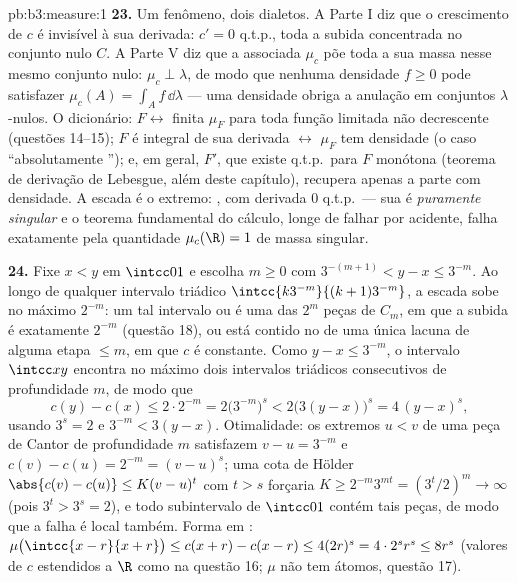 \begin{solution}{pb:b3:measure:1}
\textbf{23.} Um fenômeno, dois dialetos. A Parte I diz que o
crescimento de $c$ é invisível à sua derivada: $c' = 0$ q.t.p.,
toda a subida concentrada no conjunto nulo $C$. A Parte V
diz que a  associada $\mu_c$ põe toda a sua massa nesse
mesmo conjunto nulo: $\mu_c \perp \lambda$, de modo que nenhuma densidade $f \geq
0$ pode satisfazer $\mu_c(A) = \int_Af\,\dd\lambda$ --- uma densidade
obriga a anulação em conjuntos $\lambda$-nulos. O dicionário:
$F \leftrightarrow$  finita $\mu_F$ para toda função limitada não
decrescente (questões 14--15); $F$ é integral de sua derivada
$\leftrightarrow$ $\mu_F$ tem densidade (o caso ``absolutamente
''); e, em geral, $F'$, que existe q.t.p.\ para
$F$ monótona (teorema de derivação de Lebesgue, além
deste capítulo), recupera apenas a parte com densidade. A escada
é o extremo: , com derivada $0$ q.t.p.\ ---
sua  é \emph{puramente singular} e o teorema fundamental
do cálculo, longe de falhar por acidente, falha exatamente pela
quantidade $\mu_c(\R) = 1$ de massa singular.

\textbf{24.} Fixe $x < y$ em $\intcc01$ e escolha $m \geq 0$
com $3^{-(m+1)} < y - x \leq 3^{-m}$. Ao longo de qualquer intervalo
triádico $\intcc{k3^{-m}}{(k+1)3^{-m}}$, a escada sobe
no máximo $2^{-m}$: um tal intervalo ou é uma das $2^m$
peças de $C_m$, em que a subida é exatamente $2^{-m}$ (questão
18), ou está contido no  de uma única lacuna de alguma
etapa $\leq m$, em que $c$ é constante. Como $y - x \leq
3^{-m}$, o intervalo $\intcc xy$ encontra no máximo dois
intervalos triádicos consecutivos de profundidade $m$, de modo que
\[
c(y) - c(x) \leq 2\cdot2^{-m}
= 2\bigl(3^{-m}\bigr)^{s}
< 2\bigl(3(y - x)\bigr)^{s}
= 4\,(y - x)^{s},
\]
usando $3^{s} = 2$ e $3^{-m} < 3(y - x)$. Otimalidade: os
extremos $u < v$ de uma peça de Cantor de profundidade $m$ satisfazem $v - u =
3^{-m}$ e $c(v) - c(u) = 2^{-m} = (v - u)^{s}$; uma cota de Hölder
$\abs{c(v) - c(u)} \leq K(v - u)^{t}$ com $t > s$ forçaria
$K \geq 2^{-m}3^{mt} = (3^{t}/2)^{m} \to \infty$ (pois
$3^{t} > 3^{s} = 2$), e todo subintervalo de $\intcc01$
contém tais peças, de modo que a falha é local também.
Forma em : $\mu\bigl(\intcc{x-r}{x+r}\bigr) \leq
c(x + r) - c(x - r) \leq 4(2r)^{s} = 4\cdot2^{s}r^{s} \leq
8r^{s}$ (valores de $c$ estendidos a $\R$ como na questão 16;
$\mu$ não tem átomos, questão 17).


\end{solution}
